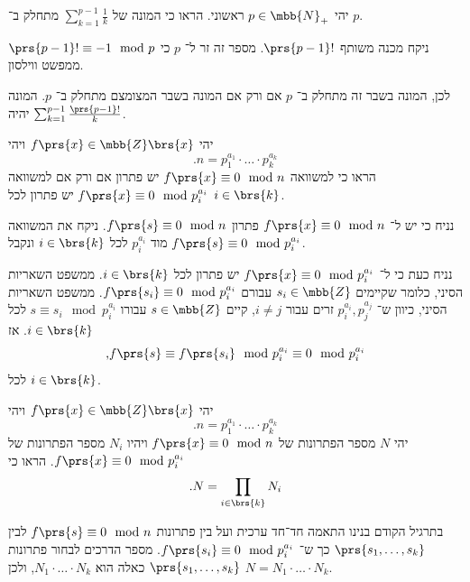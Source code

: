 \documentclass[a4paper,10pt,twoside,openany]{book}
\begin{document}
\begin{exercisechap}
יהי
$p \in \mbb{N}_+$
ראשוני.
הראו כי המונה של
$\sum_{k = 1}^{p-1} \frac{1}{k}$
מתחלק ב־%
$p$.
\end{exercisechap}

\begin{solution}
ניקח מכנה משותף
$\prs{p-1}!$.
מספר זה זר ל־%
$p$
כי
$\prs{p-1}! \equiv -1 \mod{p}$
ממפשט ווילסון.

לכן, המונה בשבר זה מתחלק ב־%
$p$
אם ורק אם המונה בשבר המצומצם מתחלק ב־%
$p$.
המונה יהיה
$\sum_{k = 1}^{p-1} \frac{\prs{p-1}!}{k}$.
\end{solution}

\begin{exercisechap}
יהי
$f\prs{x} \in \mbb{Z}\brs{x}$
ויהי
\[\text{.} n = p_1^{a_1} \cdot \ldots \cdot p_k^{a_k}\]
הראו כי למשוואה
$f\prs{x} \equiv 0 \mod{n}$
יש פתרון
אם ורק אם למשוואה
$f\prs{x} \equiv 0 \mod{p_i^{a_i}}$
יש פתרון
לכל
$i \in \brs{k}$.
\end{exercisechap}

\begin{solution}
נניח כי יש ל־%
$f\prs{x} \equiv 0 \mod{n}$
פתרון
$f\prs{s} \equiv 0 \mod{n}$.
ניקח את המשוואה מוד
$p_i^{a_i}$
לכל
$i \in \brs{k}$
ונקבל
$f\prs{s} \equiv 0 \mod{p_i^{a_i}}$.

נניח כעת כי ל־%
$f\prs{x} \equiv 0 \mod{p_i^{a_i}}$
יש פתרון לכל
$i \in \brs{k}$.
ממשפט השאריות הסיני, כלומר שקיימים
$s_i \in \mbb{Z}$
עבורם
$f\prs{s_i} \equiv 0 \mod{p_i^{a_i}}$.
ממשפט השאריות הסיני, כיוון ש־%
$p_i^{a_i}, p_j^{a_j}$
זרים עבור
$i \neq j$,
קיים
$s \in \mbb{Z}$
עבורו
$s \equiv s_i \mod{p_i^{a_i}}$
לכל
$i \in \brs{k}$.
אז
\[\text{,} f\prs{s} \equiv f\prs{s_i} \mod{p_i^{a_i}} \equiv 0 \mod{p_i^{a_i}}\]
לכל
$i \in \brs{k}$.
\end{solution}

\begin{exercisechap}
יהי
$f\prs{x} \in \mbb{Z}\brs{x}$
ויהי
\[\text{.} n = p_1^{a_1} \cdot \ldots \cdot p_k^{a_k}\]
יהי
$N$
מספר הפתרונות של
$f\prs{x} \equiv 0 \mod{n}$
ויהיו
$N_i$
מספר הפתרונות של
$f\prs{x} \equiv 0 \mod{p_i^{a_i}}$.
הראו כי
\[\text{.} N = \prod_{i \in \brs{k}} N_i\]
\end{exercisechap}

\begin{solution}
בתרגיל הקודם בנינו התאמה חד־חד ערכית ועל בין פתרונות
$f\prs{s} \equiv 0 \mod{n}$
לבין
$\prs{s_1, \ldots, s_k}$
כך ש־%
$f\prs{s_i} \equiv 0 \mod{p_i^{a_i}}$.
מספר הדרכים לבחור פתרונות
$\prs{s_1, \ldots, s_k}$
כאלה הוא
$N_1 \cdot \ldots \cdot N_k$,
ולכן
$N = N_1 \cdot \ldots \cdot N_k$.
\end{solution}
\end{document}
